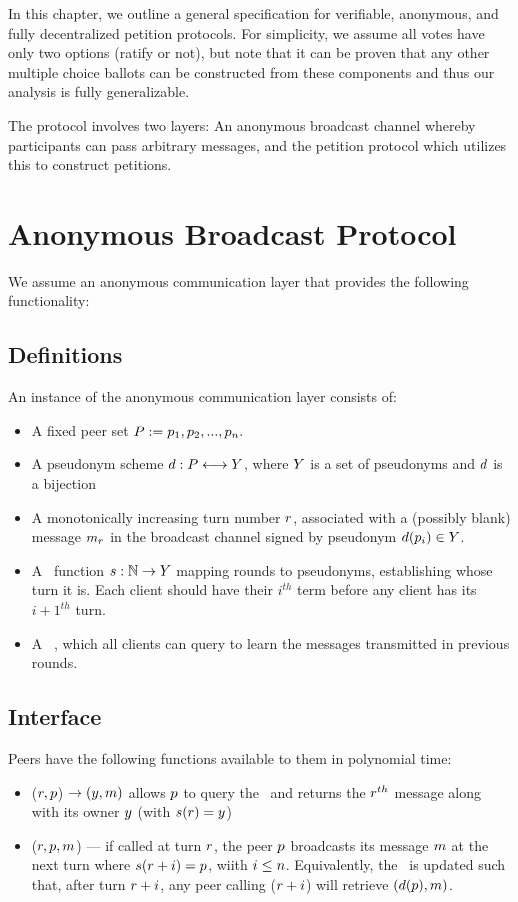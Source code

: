 In this chapter, we outline a general specification for verifiable, anonymous,
and fully decentralized petition protocols. For simplicity, we assume all votes
have only two options (ratify or not), but note that it can be proven that any
other multiple choice ballots can be constructed from these components and thus
our analysis is fully generalizable.

The protocol involves two layers: An anonymous broadcast channel whereby
participants can pass arbitrary messages, and the petition protocol which
utilizes this to construct petitions.
\section{Anonymous Broadcast Protocol}
We assume an anonymous communication layer that provides the following
functionality:

\subsection{Definitions}
An instance of the anonymous communication layer consists of:
\begin{itemize}
\item A fixed peer set
  $P:=p_{1},p_{2},...,p_{n}.$
\item A pseudonym scheme $d:P\longleftrightarrow Y$,
  where $Y$ is a set of pseudonyms and $d$ is a bijection
\item A monotonically increasing turn number $r$, associated with a
  (possibly blank) message $m_{r}$ in the broadcast channel signed by
  pseudonym $d(p_{i})\in Y$.
\item A \KwSchedule~function $s:\mathbb{N}\to Y$ mapping
  rounds to pseudonyms, establishing whose turn it is. Each client should have
  their $i^{th}$ term before any client has its $i+1^{th}$ turn.
\item A \HistoryOracle~, which all clients can query to learn the messages
  transmitted in previous rounds.
\end{itemize}

\subsection{Interface}

Peers have the following functions available to them in polynomial time:
\begin{itemize}
  \item \NameReceive($r, p$) $\to (y, m)$ allows $p$ to query
    the \HistoryOracle~and returns the $r^{th}$ message along with its owner
    $y$ (with $s(r) = y $)
  \item \NameSend($r, p, m$) --- if called at turn $r$, the peer
    $p$ broadcasts its message $m$ at the next turn where
    $s(r+i) = p$, wiith $i \le n$. Equivalently, the
    \HistoryOracle~is updated such that, after turn $r+i$, any peer calling
    \NameReceive($r+i$) will retrieve $(d(p), m)$.
\end{itemize}

